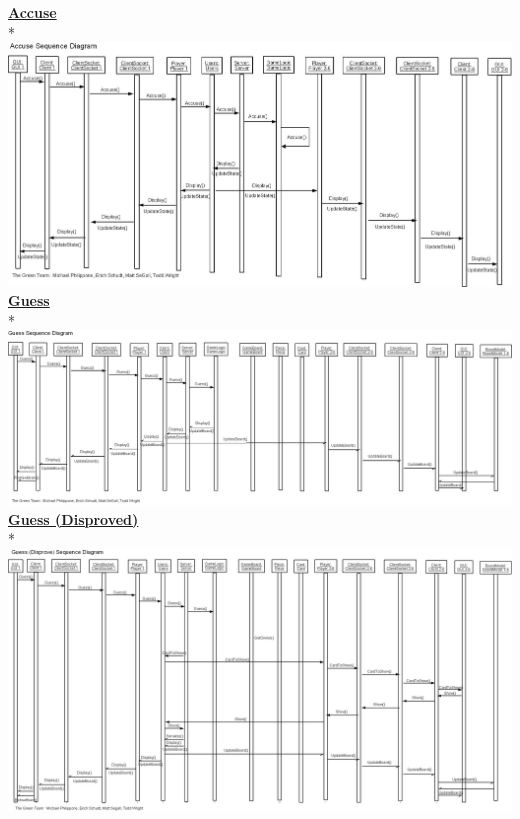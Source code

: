 \begin{flushleft}
	\newpage
%	
	{\Large \underline{\textbf{Accuse}}} \\*
	\includegraphics[angle=90,scale=.4]{../DesignDocumentation/08_SequenceDiagrams/Accuse.jpg} %
	\newpage
%
	{\Large \underline{\textbf{Guess}}} \\*
	\includegraphics[angle=90,scale=.3]{../DesignDocumentation/08_SequenceDiagrams/Guess.jpg} %
	\newpage
%
	{\Large \underline{\textbf{Guess (Disproved)}}} \\*
	\includegraphics[angle=90,scale=.3]{../DesignDocumentation/08_SequenceDiagrams/GuessDisprove.jpg} %

\end{flushleft}
